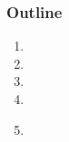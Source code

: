 \documentclass[usenames,dvipsnames]{beamer}
\begin{document}


\miniframesoff
  \begin{frame}
    \frametitle{\textbf{Outline}}
  \begin{enumerate}
    \item \introtitle
    \item \firsttitle
    \item \secondtitle
    \item \thirdtitle
    \item \textbf{\dassault}
  \end{enumerate}
  \end{frame}
\miniframeson


  

% 


% 

\end{document}
